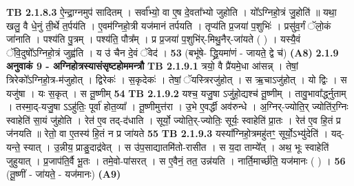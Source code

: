 \documentclass[17pt]{extarticle}
\begin{document}
                  \newline
                                \textbf{ TB 2.1.8.3} \newline
                  ऐ॒न्द्रा॒ग्नमुप॑ सादितम् । सर्वा᳚भ्यो॒ वा ए॒ष दे॒वता᳚भ्यो जुहोति । यो᳚ऽग्निहो॒त्रं जु॒होति॑ ॥ यथा॒ खलु॒ वै धे॒नुं ती॒र्थे त॒र्पय॑ति । ए॒वम॑ग्निहो॒त्री यज॑मानं तर्पयति । तृप्य॑ति प्र॒जया॑ प॒शुभिः॑ । प्रसु॑व॒र्गं ॅलो॒कं जा॑नाति । पश्य॑ति पु॒त्रम् । पश्य॑ति॒ पौत्र᳚म् । प्र प्र॒जया॑ प॒शुभि॑र्-मिथु॒नैर्-जा॑यते ( ) । यस्यै॒वं ॅवि॒दुषो᳚ऽग्निहो॒त्रं जुह्व॑ति । य उ॑ चैन दे॒वं ॅवेद॑ । \textbf{ 53} \newline
                  \newline
                                    (बभू॑षे- द्ध्रि॒यमा॑णं - जायते॒ द्वे च॑) \textbf{(A8)} \newline \newline
                \textbf{ 2.1.9     अनुवाकं   9 - अग्निहोत्रस्यासंसृष्टहोममन्त्रौ} \newline
                                \textbf{ TB 2.1.9.1} \newline
                  त्रयो॒ वै प्रै॑यमे॒धा आ॑सन्न् । तेषां॒ त्रिरेको᳚ऽग्निहो॒त्र-म॑जुहोत् । द्विरेकः॑ । स॒कृदेकः॑ । तेषां॒ ॅयस्त्रिरजु॑होत् । स ऋ॒चाऽजु॑होत् । यो द्विः । स यजु॑षा । यः स॒कृत् । स तू॒ष्णीम् \textbf{ 54} \newline
                  \newline
                                \textbf{ TB 2.1.9.2} \newline
                  यश्च॒ यजु॒षा ऽजु॑हो॒द्यश्च॑ तू॒ष्णीम् । तावु॒भावा᳚र्द्ध्नुताम् । तस्मा॒द्-यजु॒षा ऽऽहु॑तिः॒ पूर्वा॑ होत॒व्या᳚ । तू॒ष्णीमुत्त॑रा । उ॒भे ए॒वर्द्धी अव॑रुन्धे । अ॒ग्निर्-ज्योति॒र् ज्योति॑र॒ग्निः स्वाहेति॑ सा॒यं जु॑होति । रेत॑ ए॒व तद्-द॑धाति । सूर्यो॒ ज्योति॒र्-ज्योतिः॒ सूर्यः॒ स्वाहेति॑ प्रा॒तः । रेत॑ ए॒व हि॒तं प्र ज॑नयति ॥ रेतो॒ वा ए॒तस्य॑ हि॒तं न प्र जा॑यते \textbf{ 55} \newline
                  \newline
                                \textbf{ TB 2.1.9.3} \newline
                  यस्या᳚ग्निहो॒त्रमहु॑तꣳ॒॒ सूर्यो॒ऽभ्यु॑देति॑ । यद्-यन्ते॒ स्यात् । उ॒न्नीय॒ प्राङु॒दाद्र॑वेत् । स उ॑प॒साद्यातमि॑तो-रासीत । स य॒दा ताम्ये᳚त् । अथ॒ भूः स्वाहेति॑ जुहुयात् । प्र॒जाप॑ति॒र्वै भू॒तः । तमे॒वो-पा॑सरत् । स ए॒वैनं॒ तत॒ उन्न॑यति । नार्ति॒मार्च्छ॑ति॒ यज॑मानः ( ) । \textbf{ 56} \newline
                  \newline
                                    (तू॒ष्णीं - जा॑यते॒ - यज॑मानः) \textbf{(A9)} \newline \newline
\end{document}
